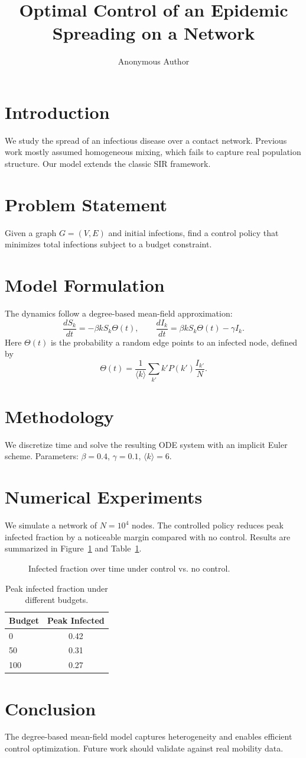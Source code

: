 \documentclass{article}
\begin{document}
\title{Optimal Control of an Epidemic Spreading on a Network}
\author{Anonymous Author}

\section{Introduction}
We study the spread of an infectious disease over a contact network.
Previous work mostly assumed homogeneous mixing, which fails to capture
real population structure. Our model extends the classic SIR framework.

\section{Problem Statement}
Given a graph $G=(V,E)$ and initial infections, find a control policy
that minimizes total infections subject to a budget constraint.

\section{Model Formulation}
The dynamics follow a degree-based mean-field approximation:
\[
\frac{dS_k}{dt} = -\beta k S_k \Theta(t), \qquad
\frac{dI_k}{dt} = \beta k S_k \Theta(t) - \gamma I_k.
\]
Here $\Theta(t)$ is the probability a random edge points to an infected node,
defined by
\[
\Theta(t) = \frac{1}{\langle k\rangle}\sum_{k'} k' P(k') \frac{I_{k'}}{N}.
\]

\section{Methodology}
We discretize time and solve the resulting ODE system with an
implicit Euler scheme. Parameters: $\beta=0.4$, $\gamma=0.1$,
$\langle k\rangle=6$.

\section{Numerical Experiments}
We simulate a network of $N=10^4$ nodes. The controlled policy reduces
peak infected fraction by a noticeable margin compared with no control.
Results are summarized in Figure~\ref{fig:curve} and Table~\ref{tab:res}.

\begin{figure}[htbp]
  \centering
  \caption{Infected fraction over time under control vs. no control.}
  \label{fig:curve}
\end{figure}

\begin{table}[htbp]
  \centering
  \caption{Peak infected fraction under different budgets.}
  \label{tab:res}
  \begin{tabular}{lc}
    \toprule
    Budget & Peak Infected \\
    \midrule
    0      & 0.42 \\
    50     & 0.31 \\
    100    & 0.27 \\
    \bottomrule
  \end{tabular}
\end{table}

\section{Conclusion}
The degree-based mean-field model captures heterogeneity and enables
efficient control optimization. Future work should validate against
real mobility data.
\end{document}
